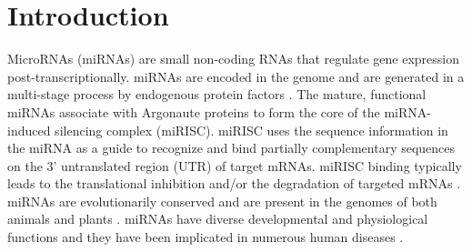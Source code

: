 \documentclass{bmcart}
\begin{document}


\section*{Introduction}
MicroRNAs (miRNAs) are small non-coding RNAs that regulate gene expression post-transcriptionally. miRNAs are encoded in the genome and are generated in a multi-stage process by endogenous protein factors \cite{finnegan2013microrna}. The mature, functional miRNAs associate with Argonaute proteins to form the core of the miRNA-induced silencing complex (miRISC). miRISC uses the sequence information in the miRNA as a guide to recognize and bind partially complementary sequences on the 3' untranslated region (UTR) of target mRNAs. miRISC binding typically leads to the translational inhibition and/or the degradation of targeted mRNAs \cite{huntzinger2011gene}. 
miRNAs are evolutionarily conserved and are present in the genomes of both animals and plants \cite{kozomara2013mirbase}. miRNAs have diverse developmental and physiological functions and they have been implicated in numerous human diseases \cite{rupaimoole2017microrna}.
\end{document}
